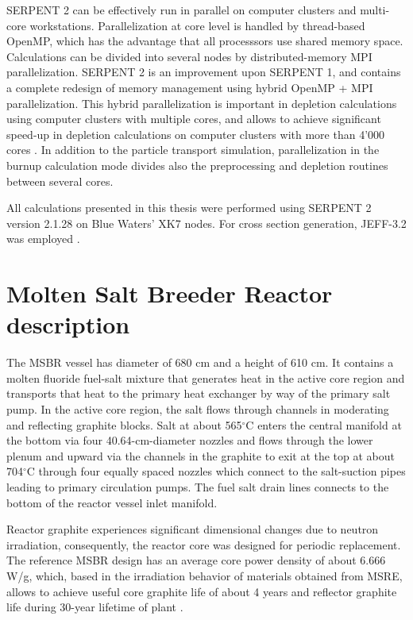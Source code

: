 SERPENT 2 can be effectively run in parallel on computer clusters and multi-core workstations. Parallelization at core level is handled by thread-based OpenMP, which has the advantage that all processsors use shared memory space. Calculations can be divided into several nodes by distributed-memory MPI parallelization. SERPENT 2  is an improvement upon SERPENT 1, and contains a complete redesign of memory management using hybrid OpenMP \cite{dagum_openmp:_1998} + \gls{MPI} parallelization.  This hybrid parallelization is important in depletion calculations using computer clusters with multiple cores, and allows to achieve significant speed-up in depletion calculations on computer clusters with more than 4'000 cores \cite{leppanen_serpent_2015-1}. In addition to the particle transport simulation, parallelization in the burnup calculation mode divides also the preprocessing and depletion routines between several cores.

All calculations presented in this thesis were performed using SERPENT 2 version 
2.1.28 on Blue Waters’ XK7 nodes. For cross section generation, JEFF-3.2 was employed \cite{oecd/nea_data_bank_jeff-3.2_2014}. 

\section{Molten Salt Breeder Reactor description}

The \gls{MSBR} vessel has diameter of 680 cm and a height of 610 cm. It 
contains a molten fluoride fuel-salt mixture that generates heat in the active 
core region and transports that heat to the primary heat exchanger by way of 
the primary salt pump. In the active core region, the salt flows through channels in moderating and reflecting graphite blocks. Salt at about 565$^{\circ}$C enters the central manifold at the bottom via four 40.64-cm-diameter nozzles and flows through 
the lower plenum and upward via the channels in the graphite to exit at the top at about 704$^{\circ}$C through four equally spaced nozzles which connect to the salt-suction pipes leading to primary circulation pumps. The fuel salt drain lines connects to the bottom of the reactor vessel inlet manifold.

Reactor graphite experiences significant dimensional changes due to neutron irradiation, consequently, the reactor core was designed for periodic replacement. The reference \gls{MSBR} design has an average core power density of about 6.666 W/g, which, based in the irradiation behavior of materials obtained from \gls{MSRE}, allows to achieve useful core graphite life of about 4 years and reflector graphite 	life during 30-year lifetime of plant \cite{robertson_conceptual_1971}.

